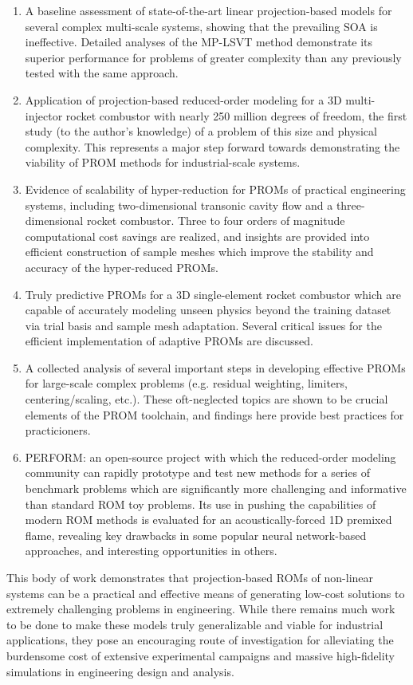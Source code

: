 \begin{enumerate}
    \item A baseline assessment of state-of-the-art linear projection-based models for several complex multi-scale systems, showing that the prevailing SOA is ineffective. Detailed analyses of the  MP-LSVT method demonstrate its superior performance for problems of greater complexity than any previously tested with the same approach.
    \item Application  of projection-based reduced-order modeling for a 3D multi-injector rocket combustor with nearly 250 million degrees of freedom, the first study (to the author's knowledge) of a problem of this size and physical complexity. This represents a major step forward towards demonstrating the viability of PROM methods for industrial-scale systems.
    \item Evidence of scalability of hyper-reduction for PROMs of practical engineering systems, including two-dimensional transonic cavity flow and a three-dimensional rocket combustor. Three to four orders of magnitude computational cost savings are realized, and insights are provided into efficient construction of sample meshes which improve the stability and accuracy of the hyper-reduced PROMs.
    \item Truly predictive PROMs for a 3D single-element rocket combustor which are capable of accurately modeling unseen physics beyond the training dataset via trial basis and sample mesh adaptation. Several critical issues for the efficient implementation of adaptive PROMs are discussed. 
    \item A collected analysis of several important steps in developing effective PROMs for large-scale complex problems (e.g. residual weighting, limiters, centering/scaling, etc.). These oft-neglected topics are shown to be crucial elements of the PROM toolchain, and findings here provide best practices for practicioners. 
    \item PERFORM: an open-source project with which the reduced-order modeling community can rapidly prototype and test new methods for a series of benchmark problems which are significantly more challenging and informative than standard ROM toy problems. Its use in pushing the capabilities of modern ROM methods is evaluated for an acoustically-forced 1D premixed flame, revealing key drawbacks in some popular neural network-based approaches, and interesting opportunities in others.
\end{enumerate}

This body of work demonstrates that projection-based ROMs of non-linear systems can be a practical and effective means of generating low-cost solutions to extremely challenging problems in engineering. While there remains much work to be done to make these models truly generalizable and viable for industrial applications, they pose an encouraging route of investigation for alleviating the burdensome cost of extensive experimental campaigns and massive high-fidelity simulations in engineering design and analysis.